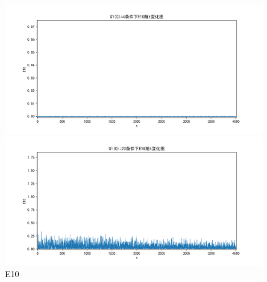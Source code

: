 \documentclass[10pt, a4paper]{article}
\begin{document}
    \begin{figure}[H]
        \begin{minipage}[t]{0.49\textwidth}
            \centering
            \includegraphics[width=\textwidth]{./q5_pics/cmp/E10.png}
        \end{minipage}
        \begin{minipage}[t]{0.49\textwidth}
            \centering
            \includegraphics[width=\textwidth]{./q5_pics/exp/E10.png}
        \end{minipage}
        \caption{E10}\label{fig:E10 in q5}
    \end{figure}
\end{document}
